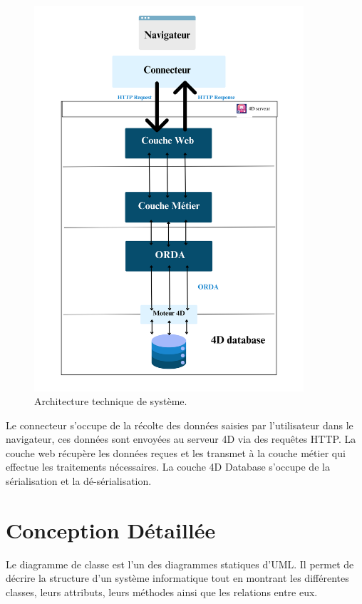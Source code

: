\begin{figure}[H]
    \centering
    \includegraphics[width=10cm]{Figures/architectureTechnique.png}
    \caption{Architecture technique de système.}
\end{figure}

Le connecteur s’occupe de la récolte des données saisies par l’utilisateur dans le navigateur, ces données sont envoyées au serveur 4D via des requêtes HTTP. La couche web
récupère les données reçues et les transmet à la couche métier qui effectue les traitements
nécessaires. La couche 4D Database s’occupe de la sérialisation et la dé-sérialisation.
\section{Conception Détaillée}

Le diagramme de classe est l’un des diagrammes statiques d’UML. Il permet de décrire
la structure d’un système informatique tout en montrant les différentes classes, leurs
attributs, leurs méthodes ainsi que les relations entre eux.

